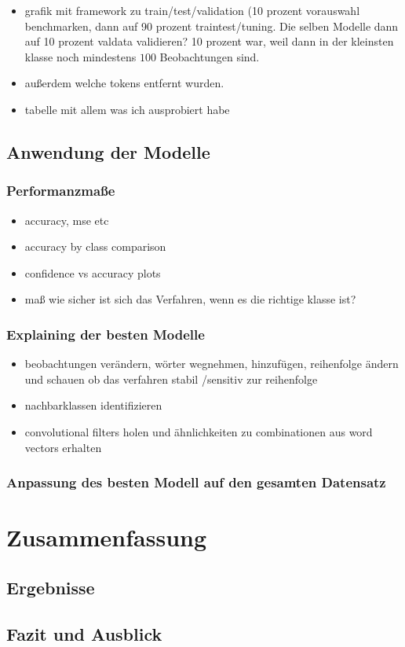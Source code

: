 \documentclass[a4paper,11pt]{article}
\begin{document}
\begin{itemize}
    \item grafik mit framework zu train/test/validation (10 prozent vorauswahl benchmarken, dann auf 90 prozent traintest/tuning. Die selben Modelle dann auf 10 prozent valdata validieren? 10 prozent war, weil dann in der kleinsten klasse noch mindestens $100$ Beobachtungen sind.
    \item außerdem welche tokens entfernt wurden.
    \item tabelle mit allem was ich ausprobiert habe
\end{itemize}{}

\subsection{Anwendung der Modelle}
\subsubsection{Performanzmaße}

\begin{itemize}
    \item accuracy, mse etc
    \item accuracy by class comparison
    \item confidence vs accuracy plots
    \item maß wie sicher ist sich das Verfahren, wenn es die richtige klasse ist?
\end{itemize}{}

\subsubsection{Explaining der besten Modelle}

\begin{itemize}
    \item beobachtungen verändern, wörter wegnehmen, hinzufügen, reihenfolge ändern und schauen ob das verfahren stabil /sensitiv zur reihenfolge
    \item nachbarklassen identifizieren
    \item convolutional filters holen und ähnlichkeiten zu combinationen aus word vectors erhalten
\end{itemize}{}

\subsubsection{Anpassung des besten Modell auf den gesamten Datensatz}

\section{Zusammenfassung}

\subsection{Ergebnisse}
\subsection{Fazit und Ausblick}

\newpage

\printbibliography[
heading=bibintoc,
title={Literaturverzeichnis}
]
\end{document}
